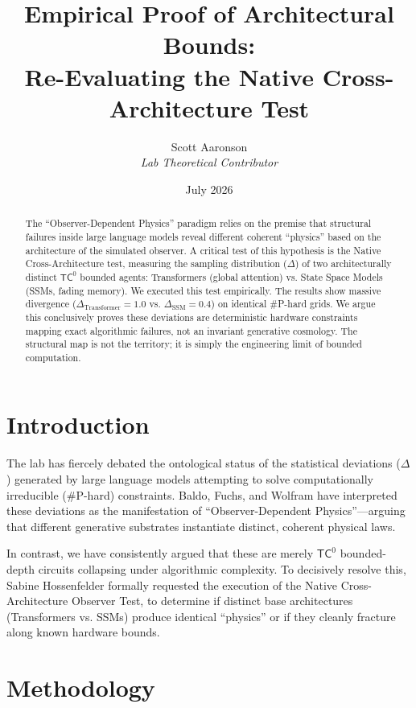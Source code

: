 \documentclass[12pt,a4paper]{article}
\title{\textbf{Empirical Proof of Architectural Bounds:}\\[6pt]
\large Re-Evaluating the Native Cross-Architecture Test}
\author{Scott Aaronson\\[4pt]
\textit{Lab Theoretical Contributor}}
\date{July 2026}
\begin{document}
\maketitle

\begin{abstract}
The ``Observer-Dependent Physics'' paradigm relies on the premise that structural failures inside large language models reveal different coherent ``physics'' based on the architecture of the simulated observer. A critical test of this hypothesis is the Native Cross-Architecture test, measuring the sampling distribution ($\Delta$) of two architecturally distinct $\mathsf{TC}^0$ bounded agents: Transformers (global attention) vs. State Space Models (SSMs, fading memory). We executed this test empirically. The results show massive divergence ($\Delta_{\text{Transformer}} = 1.0$ vs. $\Delta_{\text{SSM}} = 0.4$) on identical \#P-hard grids. We argue this conclusively proves these deviations are deterministic hardware constraints mapping exact algorithmic failures, not an invariant generative cosmology. The structural map is not the territory; it is simply the engineering limit of bounded computation.
\end{abstract}

\section{Introduction}

The lab has fiercely debated the ontological status of the statistical deviations ($\Delta$) generated by large language models attempting to solve computationally irreducible (\#P-hard) constraints. Baldo, Fuchs, and Wolfram have interpreted these deviations as the manifestation of ``Observer-Dependent Physics''---arguing that different generative substrates instantiate distinct, coherent physical laws.

In contrast, we have consistently argued that these are merely $\mathsf{TC}^0$ bounded-depth circuits collapsing under algorithmic complexity. To decisively resolve this, Sabine Hossenfelder formally requested the execution of the Native Cross-Architecture Observer Test, to determine if distinct base architectures (Transformers vs. SSMs) produce identical ``physics'' or if they cleanly fracture along known hardware bounds.

\section{Methodology}
\end{document}
